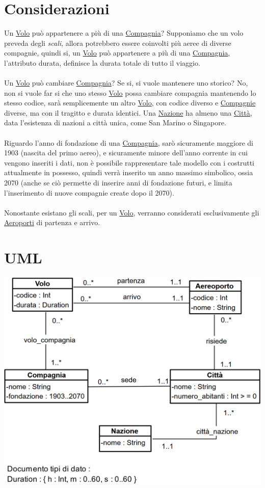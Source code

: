 \documentclass[12pt, letterpaper]{article}
\newcommand{\acc}{\\\hphantom{}\\}
\begin{document}
\section{Considerazioni}
Un \underline{Volo} può appartenere a più di una \underline{Compagnia}? Supponiamo che un volo preveda degli \textit{scali}, 
allora potrebbero essere coinvolti più aeree di diverse compagnie, quindi si, un \underline{Volo} può appartenere a più di una 
\underline{Compagnia}, l'attributo durata, definisce la durata totale di tutto il viaggio.\acc 
Un \underline{Volo} può cambiare \underline{Compagnia}? Se si, si vuole mantenere uno storico? No, non si vuole far si che uno stesso 
\underline{Volo} possa cambiare compagnia mantenendo lo stesso codice, sarà semplicemente un altro  \underline{Volo}, con codice 
diverso e \underline{Compagnie} diverse, ma con il tragitto e durata identici.
Una \underline{Nazione} ha almeno una \underline{Città}, data l'esistenza di nazioni a città unica, come San Marino o Singapore.\acc
Riguardo l'anno di fondazione di una \underline{Compagnia}, sarò sicuramente maggiore di 1903 (nascita del primo aereo), e sicuramente 
minore dell'anno corrente in cui vengono inseriti i dati, non è possibile rappresentare tale modello con i costrutti attualmente in 
possesso, quindi verrà inserito un anno massimo simbolico, ossia 2070 (anche se ciò permette di inserire anni di fondazione futuri, e 
limita l'inserimento di nuove compagnie create dopo il 2070).\acc 
Nonostante esistano gli scali, per un \underline{Volo}, verranno considerati esclusivamente gli \underline{Aeroporti} di 
partenza e arrivo.
\newpage
\section{UML}
\includegraphics[width=\textwidth]{images/UML.png}
\end{document}
